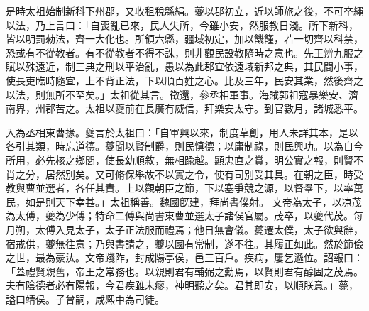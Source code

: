 \begin{pinyinscope}
 
 是時太祖始制新科下州郡，又收租稅緜絹。夔以郡初立，近以師旅之後，不可卒繩以法，乃上言曰：「自喪亂已來，民人失所，今雖小安，然服教日淺。所下新科，皆以明罰勑法，齊一大化也。所領六縣，疆域初定，加以饑饉，若一切齊以科禁，恐或有不從教者。有不從教者不得不誅，則非觀民設教隨時之意也。先王辨九服之賦以殊遠近，制三典之刑以平治亂，愚以為此郡宜依遠域新邦之典，其民間小事，使長吏臨時隨宜，上不背正法，下以順百姓之心。比及三年，民安其業，然後齊之以法，則無所不至矣。」太祖從其言。徵還，參丞相軍事。海賊郭祖寇暴樂安、濟南界，州郡苦之。太祖以夔前在長廣有威信，拜樂安太守。到官數月，諸城悉平。
 
 
入為丞相東曹掾。夔言於太祖曰：「自軍興以來，制度草創，用人未詳其本，是以各引其類，時忘道德。夔聞以賢制爵，則民慎德；以庸制祿，則民興功。以為自今所用，必先核之鄉閭，使長幼順敘，無相踰越。顯忠直之賞，明公實之報，則賢不肖之分，居然別矣。又可脩保舉故不以實之令，使有司別受其具。在朝之臣，時受教與曹並選者，各任其責。上以觀朝臣之節，下以塞爭競之源，以督羣下，以率萬民，如是則天下幸甚。」太祖稱善。魏國旣建，拜尚書僕射。
 文帝為太子，以凉茂為太傅，夔為少傅；特命二傅與尚書東曹並選太子諸侯官屬。茂卒，以夔代茂。每月朔，太傅入見太子，太子正法服而禮焉；他日無會儀。夔遷太僕，太子欲與辭，宿戒供，夔無往意；乃與書請之，夔以國有常制，遂不往。其履正如此。然於節儉之世，最為豪汰。文帝踐阼，封成陽亭侯，邑三百戶。疾病，屢乞遜位。詔報曰：「蓋禮賢親舊，帝王之常務也。以親則君有輔弼之勳焉，以賢則君有醇固之茂焉。夫有陰德者必有陽報，今君疾雖未瘳，神明聽之矣。君其即安，以順朕意。」薨，謚曰靖侯。子曾嗣，咸熈中為司徒。
 
 
\end{pinyinscope}
